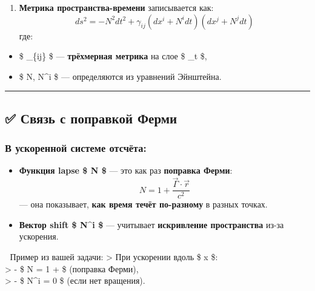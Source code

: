 \documentclass[11pt]{article}
\providecommand{\tightlist}{%
      \setlength{\itemsep}{0pt}\setlength{\parskip}{0pt}}
\begin{document}
\begin{enumerate}
\def\labelenumi{\arabic{enumi}.}
\setcounter{enumi}{2}
\tightlist
\item
  \textbf{Метрика пространства-времени} записывается как: \[
     ds^2 = -N^2 dt^2 + \gamma_{ij} (dx^i + N^i dt)(dx^j + N^j dt)
     \] где:
\end{enumerate}

\begin{itemize}
\tightlist
\item
  \$ \gamma\_\{ij\} \$ --- \textbf{трёхмерная метрика} на слое \$
  \Sigma\_t \$,
\item
  \$ N, N\^{}i \$ --- определяются из уравнений Эйнштейна.
\end{itemize}

\begin{center}\rule{0.5\linewidth}{\linethickness}\end{center}

\subsection{✅ Связь с поправкой
Ферми}\label{ux441ux432ux44fux437ux44c-ux441-ux43fux43eux43fux440ux430ux432ux43aux43eux439-ux444ux435ux440ux43cux438}

\subsubsection{В ускоренной системе
отсчёта:}\label{ux432-ux443ux441ux43aux43eux440ux435ux43dux43dux43eux439-ux441ux438ux441ux442ux435ux43cux435-ux43eux442ux441ux447ux451ux442ux430}

\begin{itemize}
\item
  \textbf{Функция lapse \$ N \$} --- это как раз \textbf{поправка
  Ферми}: \[
    N = 1 + \frac{\vec{\Gamma} \cdot \vec{r}}{c^2}
    \] --- она показывает, \textbf{как время течёт по-разному} в разных
  точках.
\item
  \textbf{Вектор shift \$ N\^{}i \$} --- учитывает \textbf{искривление
  пространства} из-за ускорения.
\end{itemize}

📌 Пример из вашей задачи: \textgreater{} При ускорении вдоль \$ x \$:\\
\textgreater{} - \$ N = 1 +  \$ (поправка Ферми),\\
\textgreater{} - \$ N\^{}i = 0 \$ (если нет вращения).
\end{document}
